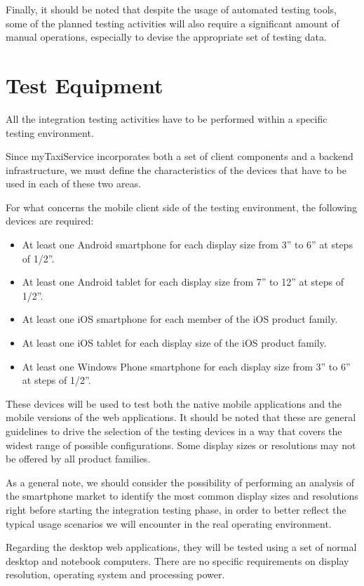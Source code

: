 Finally, it should be noted that despite the usage of automated testing tools, some of the planned testing activities will also require a significant amount of manual operations, especially to devise the appropriate set of testing data.

\section{Test Equipment}
All the integration testing activities have to be performed within a specific testing environment. 

Since myTaxiService incorporates both a set of client components and a backend infrastructure, we must define the characteristics of the devices that have to be used in each of these two areas.

For what concerns the mobile client side of the testing environment, the following devices are required:
\begin{itemize}
	\item At least one Android smartphone for each display size from 3” to 6” at steps of 1/2”.
	\item At least one Android tablet for each display size from 7” to 12” at steps of 1/2”. 
	\item At least one iOS smartphone for each member of the iOS product family.
	\item At least one iOS tablet for each display size of the iOS product family.
	\item At least one Windows Phone smartphone for each display size from 3” to 6” at steps of 1/2”. 
\end{itemize}
These devices will be used to test both the native mobile applications and the mobile versions of the web applications.
It should be noted that these are general guidelines to drive the selection of the testing devices in a way that covers the widest range of possible configurations. Some display sizes or resolutions may not be offered by all product families. 

As a general note, we should consider the possibility of performing an analysis of the smartphone market to identify the most common display sizes and resolutions right before starting the integration testing phase, in order to better reflect the typical usage scenarios we will encounter in the real operating environment. 

Regarding the desktop web applications, they will be tested using a set of normal desktop and notebook computers. There are no specific requirements on display resolution, operating system and processing power.

